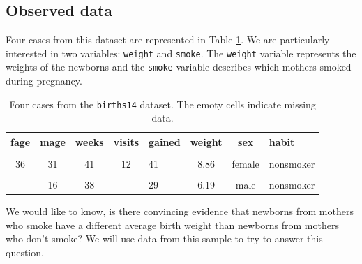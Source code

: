 \documentclass[
  10pt,
  openany]{book}
\begin{document}
\hypertarget{observed-data-13}{%
\subsection{Observed data}\label{observed-data-13}}

Four cases from this dataset are represented in Table \ref{tab:babySmokeDF}.
We are particularly interested in two variables: \texttt{weight} and \texttt{smoke}.
The \texttt{weight} variable represents the weights of the newborns and the \texttt{smoke} variable describes which mothers smoked during pregnancy.

\begin{table}[!h]

\caption{\label{tab:babySmokeDF}Four cases from the \texttt{births14} dataset. The emoty cells indicate missing data.}
\centering
\begin{tabular}[t]{cccclccl}
\toprule
fage & mage & weeks & visits & gained & weight & sex & habit\\
\midrule
\cellcolor{gray!6}{34} & \cellcolor{gray!6}{34} & \cellcolor{gray!6}{37} & \cellcolor{gray!6}{14} & \cellcolor{gray!6}{28} & \cellcolor{gray!6}{6.96} & \cellcolor{gray!6}{male} & \cellcolor{gray!6}{nonsmoker}\\
36 & 31 & 41 & 12 & 41 & 8.86 & female & nonsmoker\\
\cellcolor{gray!6}{37} & \cellcolor{gray!6}{36} & \cellcolor{gray!6}{37} & \cellcolor{gray!6}{10} & \cellcolor{gray!6}{28} & \cellcolor{gray!6}{7.51} & \cellcolor{gray!6}{female} & \cellcolor{gray!6}{nonsmoker}\\
 & 16 & 38 &  & 29 & 6.19 & male & nonsmoker\\
\bottomrule
\end{tabular}
\end{table}

We would like to know, is there convincing evidence that newborns from mothers who smoke have a different average birth weight than newborns from mothers who don't smoke?
We will use data from this sample to try to answer this question.
\end{document}
